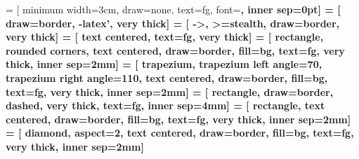 \usepackage{tikz} %
\usetikzlibrary{arrows, backgrounds, calc, fit, mindmap, positioning, shapes, shapes.geometric, tikzmark}

 = [
    minimum width=3cm,
    draw=none,
    text=fg,
    font=\bf,
    inner sep=0pt]
 = [
    draw=border,
    -latex',
    very thick]
 = [
    ->,
    >=stealth,
    draw=border,
    very thick]
 = [
    text centered,
    text=fg,
    very thick]
 = [
    rectangle,
    rounded corners,
    text centered,
    draw=border,
    fill=bg,
    text=fg,
    very thick,
    inner sep=2mm]
 = [
    trapezium,
    trapezium left angle=70,
    trapezium right angle=110,
    text centered,
    draw=border,
    fill=bg,
    text=fg,
    very thick,
    inner sep=2mm]
 = [
    rectangle,
    draw=border,
    dashed,
    very thick,
    text=fg,
    inner sep=4mm]
 = [
    rectangle,
    text centered,
    draw=border,
    fill=bg,
    text=fg,
    very thick,
    inner sep=2mm]
 = [
    diamond,
    aspect=2,
    text centered,
    draw=border,
    fill=bg,
    text=fg,
    very thick,
    inner sep=2mm]
